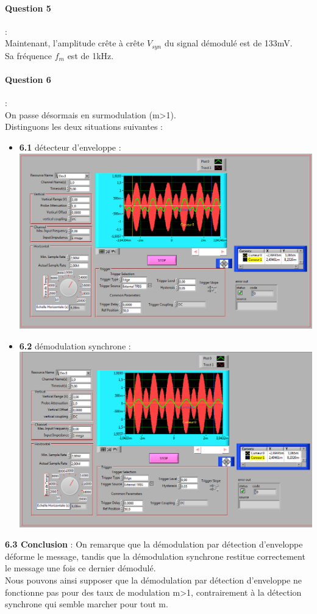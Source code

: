 \documentclass[french]{article}
\begin{document}
\paragraph{Question 5} : \\
Maintenant, l'amplitude crête à crête $V_{syn}$ du signal démodulé est de 133mV.\\
Sa fréquence $f_{m}$ est de 1kHz.
\paragraph{Question 6} : \\
On passe désormais en surmodulation (m>1). \\
Distinguons les deux situations suivantes : \\
\begin{itemize}
\item \textbf{6.1} détecteur d'enveloppe :  \\
\includegraphics[width=\textwidth]{enveloppe.png}
\item \textbf{6.2} démodulation synchrone : \\
\includegraphics[width=\textwidth]{synchrone.png}
\end{itemize}
\textbf{
6.3 Conclusion }: On remarque que la démodulation par détection d'enveloppe déforme le message, tandis que la démodulation synchrone restitue correctement le message une fois ce dernier démodulé. \\ Nous pouvons ainsi supposer que la démodulation par détection d'enveloppe ne fonctionne pas pour des taux de modulation m>1, contrairement à la détection synchrone qui semble marcher pour tout m. 
\end{document}
